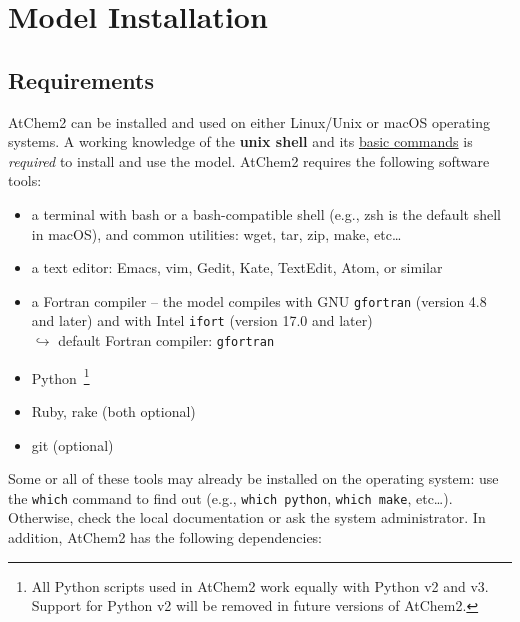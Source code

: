 %
%
%
%

\chapter{Model Installation} \label{ch:installation}

\section{Requirements} \label{sec:requirements}

AtChem2 can be installed and used on either Linux/Unix or macOS
operating systems. A working knowledge of the \textbf{unix shell} and
its \href{https://swcarpentry.github.io/shell-novice}{basic commands}
is \emph{required} to install and use the model. AtChem2 requires the
following software tools:

\begin{itemize}
\item a terminal with bash or a bash-compatible shell (e.g., zsh is
  the default shell in macOS), and common utilities: wget, tar, zip,
  make, etc\ldots
\item a text editor: Emacs, vim, Gedit, Kate, TextEdit, Atom, or similar
\item a Fortran compiler -- the model compiles with GNU \texttt{gfortran}
  (version 4.8 and later) and with Intel \texttt{ifort} (version 17.0 and later)\\
  $\hookrightarrow$ default Fortran compiler: \texttt{gfortran}
\item Python~\footnote{All Python scripts used in AtChem2 work equally
    with Python v2 and v3. Support for Python v2 will be removed in
    future versions of AtChem2.}
\item Ruby, rake (both optional)
\item git (optional)
\end{itemize}

Some or all of these tools may already be installed on the operating
system: use the \texttt{which} command to find out (e.g.,
\verb|which python|, \verb|which make|, etc\ldots). Otherwise, check
the local documentation or ask the system administrator. In addition,
AtChem2 has the following dependencies:

